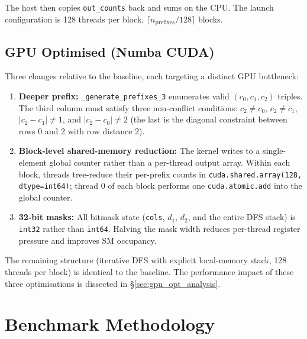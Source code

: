 \documentclass[12pt, letterpaper]{article}
\begin{document}
The host then copies \texttt{out\_counts} back and sums on the CPU. The launch configuration is 128 threads per block, $\lceil n_{\text{prefixes}} / 128 \rceil$ blocks.

\subsection{GPU Optimised (Numba CUDA)}

Three changes relative to the baseline, each targeting a distinct GPU bottleneck:

\begin{enumerate}
    \item \textbf{Deeper prefix:} \texttt{\_generate\_prefixes\_3} enumerates valid $(c_0, c_1, c_2)$ triples. The third column must satisfy three non-conflict conditions: $c_2 \neq c_0$, $c_2 \neq c_1$, $|c_2 - c_1| \neq 1$, and $|c_2 - c_0| \neq 2$ (the last is the diagonal constraint between rows 0 and 2 with row distance 2).
    \item \textbf{Block-level shared-memory reduction:} The kernel writes to a single-element global counter rather than a per-thread output array. Within each block, threads tree-reduce their per-prefix counts in \texttt{cuda.shared.array(128, dtype=int64)}; thread 0 of each block performs one \texttt{cuda.atomic.add} into the global counter.
    \item \textbf{32-bit masks:} All bitmask state (\texttt{cols}, $d_1$, $d_2$, and the entire DFS stack) is \texttt{int32} rather than \texttt{int64}. Halving the mask width reduces per-thread register pressure and improves SM occupancy.
\end{enumerate}

The remaining structure (iterative DFS with explicit local-memory stack, 128 threads per block) is identical to the baseline. The performance impact of these three optimisations is dissected in \S\ref{sec:gpu_opt_analysis}.

\section{Benchmark Methodology}
\label{sec:method}
\end{document}
